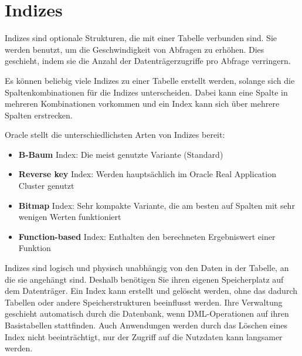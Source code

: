     \section{Indizes}
      Indizes sind optionale Strukturen, die mit einer Tabelle verbunden sind. Sie werden benutzt, um die Geschwindigkeit von Abfragen zu erhöhen. Dies geschieht, indem sie die Anzahl der Datenträgerzugriffe pro Abfrage verringern.

      Es können beliebig viele Indizes zu einer Tabelle erstellt werden, solange sich die Spaltenkombinationen für die Indizes unterscheiden. Dabei kann eine Spalte in mehreren Kombinationen vorkommen und ein Index kann sich über mehrere Spalten erstrecken.

      Oracle stellt die unterschiedlichsten Arten von Indizes bereit:
      \begin{itemize}
        \item \textbf{B-Baum} Index: Die meist genutzte Variante (Standard)
        \item \textbf{Reverse key} Index: Werden hauptsächlich im Oracle Real Application Cluster genutzt
        \item \textbf{Bitmap} Index: Sehr kompakte Variante, die am besten auf Spalten mit sehr wenigen Werten funktioniert
        \item \textbf{Function-based} Index: Enthalten den berechneten Ergebniswert einer Funktion
      \end{itemize}
      Indizes sind logisch und physisch unabhängig von den Daten in der Tabelle, an die sie angehängt sind. Deshalb benötigen Sie ihren eigenen Speicherplatz auf dem Datenträger. Ein Index kann erstellt und gelöscht werden, ohne das dadurch Tabellen oder andere Speicherstrukturen beeinflusst werden. Ihre Verwaltung geschieht automatisch durch die Datenbank, wenn DML-Operationen auf ihren Basistabellen stattfinden. Auch Anwendungen werden durch das Löschen eines Index nicht beeinträchtigt, nur der Zugriff auf die Nutzdaten kann  langsamer werden.

